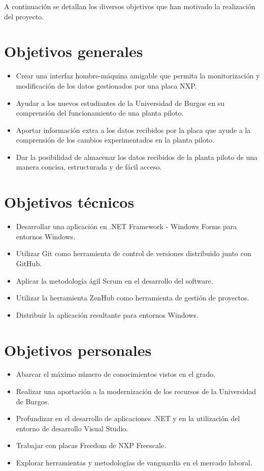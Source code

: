 
A continuación se detallan los diversos objetivos que han motivado la realización del proyecto.

\section{Objetivos generales}

\begin{itemize}
	\item Crear una interfaz hombre-máquina amigable que permita la monitorización y modificación de los datos gestionados por una placa NXP.
	\item Ayudar a los nuevos estudiantes de la Universidad de Burgos en su comprensión del funcionamiento de una planta piloto.
	\item Aportar información extra a los datos recibidos por la placa que ayude a la comprensión de los cambios experimentados en la planta piloto.
	\item Dar la posibilidad de almacenar los datos recibidos de la planta piloto de una manera concisa, estructurada y de fácil acceso.
\end{itemize}

\section{Objetivos técnicos}

\begin{itemize}
	\item Desarrollar una aplicación en .NET Framework - Windows Forms para entornos Windows.
	\item Utilizar Git como herramienta de control de versiones distribuido junto con GitHub.
	\item Aplicar la metodología ágil Scrum en el desarrollo del software.
	\item Utilizar la herramienta ZenHub como herramienta de gestión de proyectos.
	\item Distribuir la aplicación resultante para entornos Windows.
\end{itemize}

\section{Objetivos personales}

\begin{itemize}
	\item Abarcar el máximo número de conocimientos vistos en el grado.
	\item Realizar una aportación a la modernización de los recursos de la Universidad de Burgos.
	\item Profundizar en el desarrollo de aplicaciones .NET y en la utilización del entorno de desarrollo Visual Studio.
	\item Trabajar con placas Freedom de NXP Freescale.
	\item Explorar herramientas y metodologías de vanguardia en el mercado laboral.
\end{itemize}